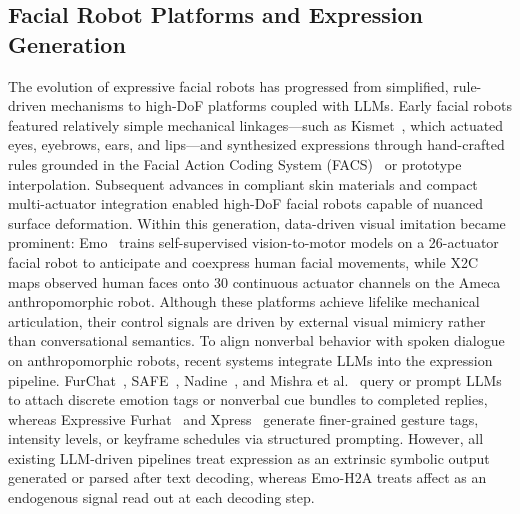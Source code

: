 \documentclass[letterpaper, 10 pt, conference]{ieeeconf/ieeeconf}
\begin{document}
\subsection{Facial Robot Platforms and Expression Generation}
The evolution of expressive facial robots has progressed from simplified, rule-driven mechanisms to high-DoF platforms coupled with LLMs. Early facial robots featured relatively simple mechanical linkages---such as Kismet~\cite{breazeal2002designing}, which actuated eyes, eyebrows, ears, and lips---and synthesized expressions through hand-crafted rules grounded in the Facial Action Coding System (FACS)~\cite{ekman1978facs} or prototype interpolation. Subsequent advances in compliant skin materials and compact multi-actuator integration enabled high-DoF facial robots capable of nuanced surface deformation. Within this generation, data-driven visual imitation became prominent: Emo~\cite{hu2024emo} trains self-supervised vision-to-motor models on a 26-actuator facial robot to anticipate and coexpress human facial movements, while X2C~\cite{li2025x2c} maps observed human faces onto 30 continuous actuator channels on the Ameca anthropomorphic robot. Although these platforms achieve lifelike mechanical articulation, their control signals are driven by external visual mimicry rather than conversational semantics. To align nonverbal behavior with spoken dialogue on anthropomorphic robots, recent systems integrate LLMs into the expression pipeline. FurChat~\cite{cherakara2023furchat}, SAFE~\cite{lee2023safe}, Nadine~\cite{kang2024nadine}, and Mishra et al.~\cite{mishra2023realtime} query or prompt LLMs to attach discrete emotion tags or nonverbal cue bundles to completed replies, whereas Expressive Furhat~\cite{abbo2025expressive} and Xpress~\cite{antony2025xpress} generate finer-grained gesture tags, intensity levels, or keyframe schedules via structured prompting. However, all existing LLM-driven pipelines treat expression as an extrinsic symbolic output generated or parsed after text decoding, whereas Emo-H2A treats affect as an endogenous signal read out at each decoding step.
\end{document}
